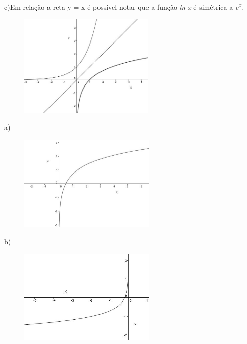 \begin{respostas}{7}
c)Em relação a reta y = x é possível notar que a função \textit{ln x} é simétrica a \textit{e\textsuperscript{x}}.
\begin{figure}[H]
    \begin{Center}
        \includegraphics[width=2.55in,height=1.94in]{capitulos/logaritmos_e_funcao_logaritmica/media/image25.JPG}
    \end{Center}    
\end{figure} 

    \ansitem{}

a)\begin{figure}[H]
	\begin{Center}
		\includegraphics[width=2.56in,height=1.81in]{capitulos/logaritmos_e_funcao_logaritmica/media/image26.JPG}
	\end{Center}
\end{figure}

b)\begin{figure}[H]
	\begin{Center}
		\includegraphics[width=2.56in,height=1.78in]{capitulos/logaritmos_e_funcao_logaritmica/media/image27.JPG}
	\end{Center}
\end{figure}


\end{respostas}

